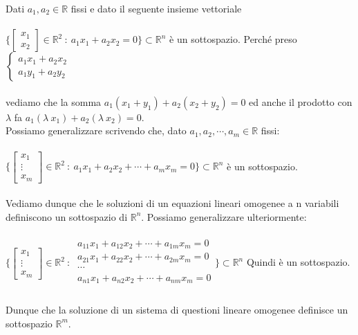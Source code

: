 \begin{example}
Dati $a_1, a_2 \in \mathbb{R}$ fissi e dato il seguente insieme vettoriale\\\\
$\Bigg \{ \begin{bmatrix}x_1 \\ x_2\end{bmatrix}\in \mathbb{R}^2 \: : \: a_1x_1 + a_2x_2 = 0\Bigg\} \subset \mathbb{R}^n$ è un sottospazio. Perché preso
$\begin{cases}a_1x_1 + a_2x_2 \\a_1y_1 + a_2y_2 \end{cases}$\\\\
vediamo che la somma $a_1(x_1 + y_1) + a_2(x_2 + y_2) = 0$ ed anche il prodotto con $\lambda$ fa $a_1(\lambda\: x_1) + a_2(\lambda \: x_2)=0$.\\
Possiamo generalizzare scrivendo che, dato $a_1, a_2, \cdots, a_m \in \mathbb{R}$ fissi:\\\\
$\Bigg \{ \begin{bmatrix}x_1 \\ \vdots \\ x_m\end{bmatrix}\in \mathbb{R}^2 \: : \: a_1x_1 + a_2x_2 + \cdots + a_mx_m = 0\Bigg\} \subset \mathbb{R}^n$ è un sottospazio.\\\\Vediamo dunque che le soluzioni di un equazioni lineari omogenee a n variabili definiscono un sottospazio di $\mathbb{R}^n$. Possiamo generalizzare ulteriormente:\\\\
$\Bigg \{ \begin{bmatrix}x_1 \\ \vdots \\ x_m\end{bmatrix}\in \mathbb{R}^2 \: : \: \begin{array}{l}
    a_{11}x_1 + a_{12}x_2 + \cdots + a_{1m}x_m = 0\\
    a_{21}x_1 + a_{22}x_2 + \cdots + a_{2m}x_m = 0\\
    \cdots\\
    a_{n1}x_1 + a_{n2}x_2 + \cdots + a_{nm}x_m = 0\\
\end{array}\Bigg\} \subset \mathbb{R}^n$ Quindi è un sottospazio.\\\\
Dunque che la soluzione di un sistema di questioni lineare omogenee definisce un sottospazio $\mathbb{R}^m$.
\end{example}

